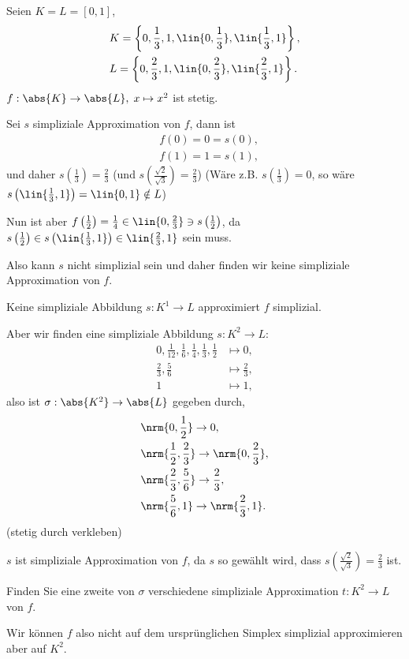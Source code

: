 \begin{bspn}
Seien $K=L=[0,1]$,
\begin{align*}
&K=\left\{0,\frac{1}{3},1,\lin{0,\frac{1}{3}},\lin{\frac{1}{3},1}\right\},\\
&L=\left\{0,\frac{2}{3},1,\lin{0,\frac{2}{3}},\lin{\frac{2}{3},1}\right\}.
\end{align*}
$f: \abs{K}\to\abs{L},\; x\mapsto x^2$ ist stetig.

Sei $s$ simpliziale Approximation von $f$, dann ist
\begin{align*}
&f(0) = 0 = s(0),\\
&f(1) = 1 = s(1),
\end{align*}
und daher $s\left(\frac{1}{3}\right) = \frac{2}{3}$ (und
$s\left(\frac{\sqrt{2}}{\sqrt{3}}\right) = \frac{2}{3}$)
(Wäre z.B. $s\left(\frac{1}{3}\right) = 0$, so wäre
$s\left(\lin{\frac{1}{3},1}\right) = \lin{0,1} \notin L$)

Nun ist aber $f\left(\frac{1}{2}\right) = \frac{1}{4}\in
\lin{0,\frac{2}{3}}\ni s\left(\frac{1}{2}\right)$,
da $s\left(\frac{1}{2}\right) \in s\left(\lin{\frac{1}{3},1}\right) \in
\lin{\frac{2}{3},1}$ sein muss.

Also kann $s$ nicht simplizial sein und daher finden wir keine simpliziale
Approximation von $f$.

\begin{bemn}[Ähnlich:]
Keine simpliziale Abbildung $s: K^1 \to L$ approximiert $f$ simplizial.
\end{bemn}
Aber wir finden eine simpliziale Abbildung $s: K^2\to L$:
\begin{align*}
0,\frac{1}{12},\frac{1}{6}, \frac{1}{4},\frac{1}{3},\frac{1}{2}&\mapsto
0,\\
\frac{2}{3},\frac{5}{6}&\mapsto \frac{2}{3},\\
1&\mapsto 1,
\end{align*}
also ist $\sigma: \abs{K^2}\to \abs{L}$ gegeben durch,
\begin{align*}
&\nrm{0,\frac{1}{2}} \to 0,\\
&\nrm{\frac{1}{2},\frac{2}{3}} \to \nrm{0,\frac{2}{3}},\\
&\nrm{\frac{2}{3},\frac{5}{6}} \to \frac{2}{3},\\
&\nrm{\frac{5}{6},1} \to \nrm{\frac{2}{3},1}.
\end{align*}
(stetig durch verkleben)

$s$ ist simpliziale Approximation von $f$, da $s$ so gewählt wird,
dass $s\left(\frac{\sqrt{2}}{\sqrt{3}}\right) = \frac{2}{3}$ ist.\bsphere
\end{bspn}
\begin{propn}[Problem]
Finden Sie eine zweite von $\sigma$ verschiedene simpliziale Approximation $t:
K^2\to L$ von $f$.\fishhere
\end{propn}
Wir können $f$ also nicht auf dem ursprünglichen Simplex simplizial
approximieren aber auf $K^2$.

